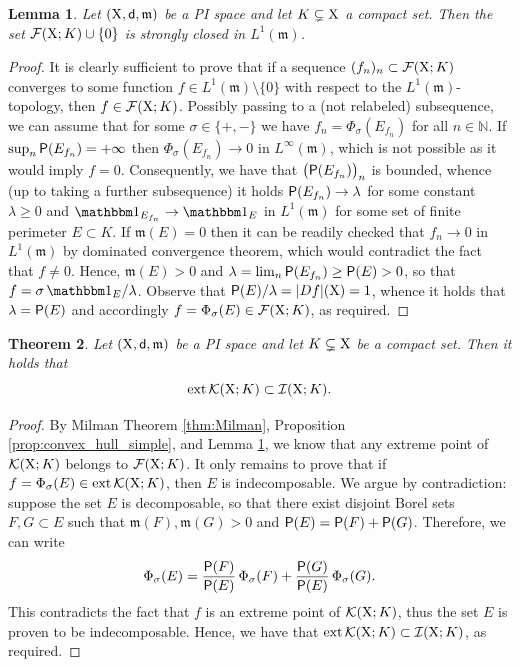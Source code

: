 \documentclass[reqno]{amsart}
\numberwithin{equation}{section}
\newcommand{\N}{\mathbb{N}}
\newcommand{\X}{{\rm X}}
\newcommand{\sfd}{{\sf d}}
\newcommand{\mm}{\mathfrak m}
\newcommand{\1}{\mathbbm 1}
\renewcommand{\P}{{\sf P}}
\newtheorem{theorem}{Theorem}[section]
\newtheorem{lemma}[theorem]{Lemma}
\begin{document}
%
%
\begin{lemma}\label{lem:F(X,K)_closed}
Let \((\X,\sfd,\mm)\) be a PI space and let \(K\subsetneq\X\) a compact set.
Then the set \(\mathcal F(\X;K)\cup\{0\}\) is strongly closed in \(L^1(\mm)\).
\end{lemma}
\begin{proof}
It is clearly sufficient to prove that if a sequence \((f_n)_n\subset\mathcal F(\X;K)\)
converges to some function \(f\in L^1(\mm)\setminus\{0\}\) with respect to the
\(L^1(\mm)\)-topology, then \(f\in\mathcal F(\X;K)\).
Possibly passing to a (not relabeled) subsequence, we can assume that for some
\(\sigma\in\{+,-\}\) we have \(f_n=\Phi_\sigma(E_{f_n})\) for all \(n\in\N\).
If \(\sup_n\P(E_{f_n})=+\infty\) then
\(\Phi_\sigma(E_{f_n})\to 0\) in \(L^\infty(\mm)\), which is not possible as
it would imply \(f=0\). Consequently, we have that
\(\big(\P(E_{f_n})\big)_n\) is bounded, whence (up to taking a further
subsequence) it holds \(\P(E_{f_n})\to\lambda\) for some constant \(\lambda\geq 0\)
and \(\1_{E_{f_n}}\to\1_E\) in \(L^1(\mm)\) for some set of finite perimeter
\(E\subset K\). If \(\mm(E)=0\) then it can be readily checked that \(f_n\to 0\)
in \(L^1(\mm)\) by dominated convergence theorem, which would contradict the fact
that \(f\neq 0\). Hence, \(\mm(E)>0\) and \(\lambda=\lim_n\P(E_{f_n})\geq\P(E)>0\),
so that \(f=\sigma\,\1_E/\lambda\). Observe that \(\P(E)/\lambda=|Df|(\X)=1\),
whence it holds that \(\lambda=\P(E)\) and accordingly
\(f=\Phi_\sigma(E)\in\mathcal F(\X;K)\), as required.
\end{proof}
%
%
\begin{theorem}\label{thm:mu_conc_indecomp}
Let \((\X,\sfd,\mm)\) be a PI space and let \(K\subsetneq\X\) be a compact set.
Then it holds that
\[
{\rm ext}\,\mathcal K(\X;K)\subset\mathcal I(\X;K).
\]
\end{theorem}
\begin{proof}
By Milman Theorem \ref{thm:Milman}, Proposition \ref{prop:convex_hull_simple}, and
Lemma \ref{lem:F(X,K)_closed}, we know that any extreme point of \(\mathcal K(\X;K)\)
belongs to \(\mathcal F(\X;K)\).
It only remains to prove that if \(f=\Phi_\sigma(E)\in{\rm ext}\,\mathcal K(\X;K)\),
then \(E\) is indecomposable. We argue by contradiction: suppose the set \(E\) is decomposable,
so that there exist disjoint Borel sets \(F,G\subset E\) such that \(\mm(F),\mm(G)>0\)
and \(\P(E)=\P(F)+\P(G)\). Therefore, we can write
\[
\Phi_\sigma(E)=\frac{\P(F)}{\P(E)}\,\Phi_\sigma(F)+\frac{\P(G)}{\P(E)}\,\Phi_\sigma(G).
\]
This contradicts the fact that \(f\) is an extreme point of \(\mathcal K(\X;K)\),
thus the set \(E\) is proven to be indecomposable. Hence, we have that
\({\rm ext}\,\mathcal K(\X;K)\subset\mathcal I(\X;K)\), as required.
\end{proof}
\end{document}
